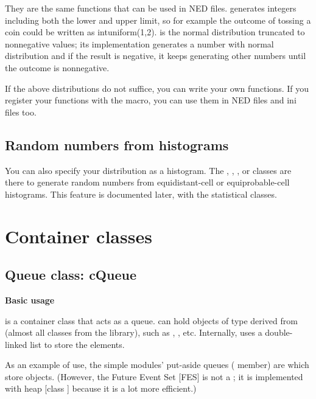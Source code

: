\begin{longtable}{|p{6.5cm}|p{7.5cm}|}
\end{longtable}


They are the same functions that can be used in NED files.
 generates integers including both the lower and
upper limit, so for example the outcome of tossing a coin could be
written as intuniform(1,2).   is the normal
distribution truncated to nonnegative values; its implementation
generates a number with normal distribution and if the result is
negative, it keeps generating other numbers until the outcome is
nonnegative.

If the above distributions do not suffice, you can write your own
functions. If you register your functions
with the  macro, you can use them in NED
files and ini files too.


\subsection{Random numbers from histograms}

You can also specify your distribution as a
histogram. The
, ,
,  or  classes
are there to generate random numbers from equi\-dis\-tant-cell or
equiprobable-cell histograms.  This feature is documented later, with
the statistical classes.





\section{Container classes}

\subsection{Queue class: cQueue}

\textbf{Basic usage}


 is a container class that acts as a queue.
 can hold objects of type derived from 
(almost all classes from the {\opp} library), such as
, , etc. Internally, 
uses a double-linked list to store the elements.

As an example of use, the simple modules'
put-aside queues ( member) are 
which store  objects. (However, the Future Event Set
[FES] is not a ; it is implemented with heap
[class ] because it is a lot more efficient.)

